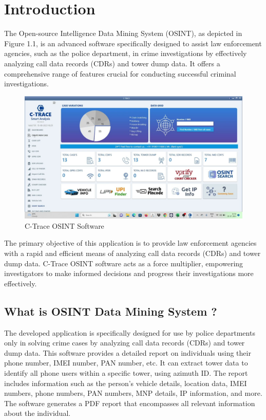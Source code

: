 \chapter{Introduction}
\justify

The Open-source Intelligence Data Mining System (OSINT), as depicted in Figure 1.1, is an advanced software specifically designed to assist law enforcement agencies, such as the police department, in crime investigations by effectively analyzing call data records (CDRs) and tower dump data. It offers a comprehensive range of features crucial for conducting successful criminal investigations.

\begin{figure}
    \centering
    \includegraphics[width=1\linewidth]{Media/maxresdefault.jpg}
    \caption{C-Trace OSINT Software}
    \label{fig:C-Trace OSINT Software}
\end{figure}

The primary objective of this application is to provide law enforcement agencies with a rapid and efficient means of analyzing call data records (CDRs) and tower dump data. C-Trace OSINT software acts as a force multiplier, empowering investigators to make informed decisions and progress their investigations more effectively.

\section{What is OSINT Data Mining System ?}

The developed application is specifically designed for use by police departments only in solving crime cases by analyzing call data records (CDRs) and tower dump data. This software provides a detailed report on individuals using their phone number, IMEI number, PAN number, etc. It can extract tower data to identify all phone users within a specific tower, using azimuth ID. The report includes information such as the person's vehicle details, location data, IMEI numbers, phone numbers, PAN numbers, MNP details, IP information, and more. The software generates a PDF report that encompasses all relevant information about the individual.

